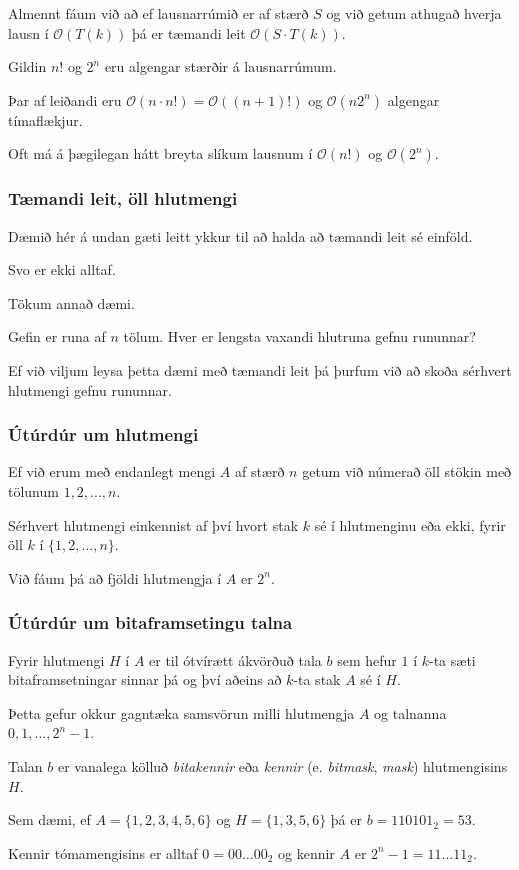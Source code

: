 {
	{
		\item<1-> Almennt fáum við að ef lausnarrúmið er af stærð $S$ og við getum athugað hverja lausn í $\mathcal{O}(T(k))$
			þá er tæmandi leit $\mathcal{O}(S \cdot T(k))$.
		\item<2-> Gildin $n!$ og $2^n$ eru algengar stærðir á lausnarrúmum.
		\item<3-> Þar af leiðandi eru $\mathcal{O}(n \cdot n!) = \mathcal{O}((n + 1)!)$ og $\mathcal{O}(n 2^n)$ algengar tímaflækjur.
		\item<4-> Oft má á þægilegan hátt breyta slíkum lausnum í $\mathcal{O}(n!)$ og $\mathcal{O}(2^n)$.
	}
}

{
	\frametitle{Tæmandi leit, öll hlutmengi}
	{
		\item<1-> Dæmið hér á undan gæti leitt ykkur til að halda að tæmandi leit sé einföld.
		\item<2-> Svo er ekki alltaf.
		\item<3-> Tökum annað dæmi.
		\item<4-> Gefin er runa af $n$ tölum. Hver er lengsta vaxandi hlutruna gefnu rununnar?
		\item<5-> Ef við viljum leysa þetta dæmi með tæmandi leit þá þurfum við að skoða sérhvert hlutmengi gefnu rununnar.
	}
}

{
	\frametitle{Útúrdúr um hlutmengi}
	{
		\item<1-> Ef við erum með endanlegt mengi $A$ af stærð $n$ getum við númerað öll stökin með tölunum $1, 2, ..., n$.
		\item<2-> Sérhvert hlutmengi einkennist af því hvort stak $k$ sé í hlutmenginu eða ekki, fyrir öll $k$ í $\{1, 2, ..., n\}$.
		\item<3-> Við fáum þá að fjöldi hlutmengja í $A$ er $2^n$.
	}
}

{
	\frametitle{Útúrdúr um bitaframsetingu talna}
	{
		\item<1-> Fyrir hlutmengi $H$ í $A$ er til ótvírætt ákvörðuð tala $b$ sem hefur $1$ í
			$k$-ta sæti bitaframsetningar sinnar þá og því aðeins að $k$-ta stak $A$ sé í $H$.
		\item<2-> Þetta gefur okkur gagntæka samsvörun milli hlutmengja $A$ og talnanna $0, 1, ..., 2^n - 1$.
		\item<3-> Talan $b$ er vanalega kölluð \emph{bitakennir} eða \emph{kennir} (e. \emph{bitmask}, \emph{mask}) hlutmengisins $H$.
		\item<4-> Sem dæmi, ef $A = \{1, 2, 3, 4, 5, 6\}$ og $H = \{1, 3, 5, 6\}$ þá er $b = 110101_2 = 53$.
		\item<5-> Kennir tómamengisins er alltaf $0 = 00\! \dots\! 00_2$ og kennir $A$ er $2^n - 1 = 11\! \dots\! 11_2$.
	}
}

